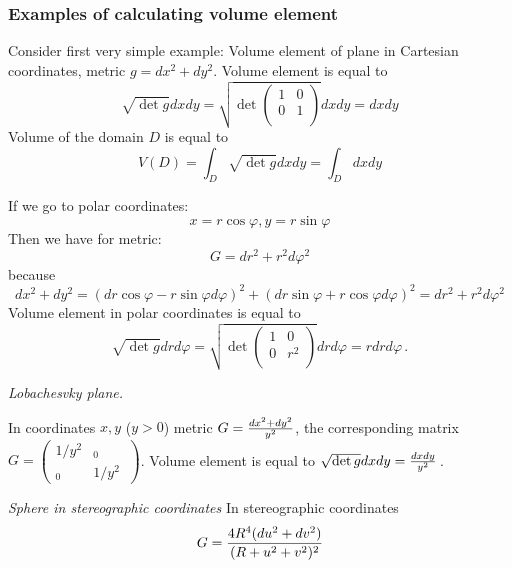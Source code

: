 \documentclass[12pt]{article}
\theoremstyle{theorem}
\numberwithin{equation}{section}
\begin{document}
\subsubsection { Examples of calculating volume element}


Consider first very simple example: Volume element of plane in Cartesian coordinates,
metric $g=dx^2+dy^2$. Volume element  is equal to
                      $$
         \sqrt {\det g}dxdy=
         \sqrt
           {
         \det
         \left(
    \begin{array}{cc}
  1 & 0 \\
  0&  1 \\
\end{array}
\right)}dxdy=dxdy
                      $$
  Volume of the domain $D$ is equal to
              $$
          V(D)=\int_D\sqrt {\det g}dxdy=\int_D dxdy
              $$

If we go to polar coordinates:
 \begin{equation}\label{polarcoord1}
    x=r\cos\varphi, y=r\sin\varphi
\end{equation}
Then we have for metric:
              $$
G=dr^2+r^2d\varphi^2
              $$
because
               \begin{equation}\label{polarknow}
       dx^2+dy^2=(dr\cos\varphi-r\sin\varphi d\varphi)^2+
    (dr\sin\varphi+r\cos\varphi d\varphi)^2
       =dr^2+r^2 d\varphi^2
              \end{equation}
Volume element in polar coordinates is equal to
  $$
           \sqrt {\det g}drd\varphi=
         \sqrt
           {
         \det
         \left(
    \begin{array}{cc}
  1 & 0 \\
  0&  r^2 \\
\end{array}
\right)}drd\varphi=rdrd\varphi\,.
  $$

\medskip
\m

{\it Lobachesvky plane.}

 In coordinates $x,y$ ($y>0$) metric $G={dx^2+dy^2\over y^2}$,
 the corresponding matrix $G=\begin{pmatrix}
      {1/y^2} & _0 \\
   _0 & {1/y^2} \
 \end{pmatrix}$. Volume element is equal to
 $\sqrt {\det g} dxdy={dxdy\over y^2}$\,.



 {  \it Sphere in stereographic coordinates}
 In stereographic coordinates 
                     \begin{equation}\label{stereographic}
    G={4R^4(du^2+dv^2)\over (R+u^2+v^2)^2}
\end{equation}
\end{document}
